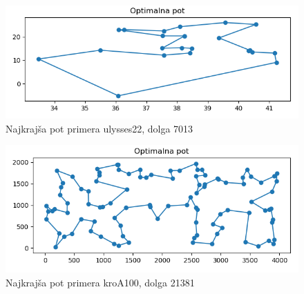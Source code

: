 \documentclass[12pt,a4paper]{amsart}
\theoremstyle{definition} %
\theoremstyle{plain} %
\begin{document}
\begin{figure}[H]
\caption{Najkrajša pot primera ulysses22, dolga 7013}
\centering
\includegraphics[scale =0.5]{ulysses22_7013}
\end{figure}

\begin{figure}[H]
\caption{Najkrajša pot primera kroA100, dolga 21381}
\centering
\includegraphics[scale =0.5]{kroA100_21381}
\end{figure}
\end{document}
